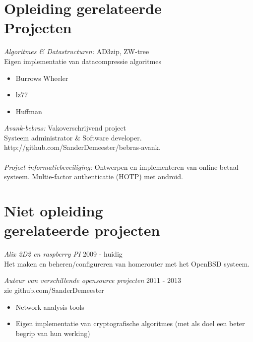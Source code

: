 \documentclass[margin, 10pt]{res} %
\begin{document}
\begin{resume}

\section{Opleiding gerelateerde \\ Projecten} 

{\sl Algoritmes \& Datastructuren:} AD3zip, ZW-tree \\
Eigen implementatie van datacompressie algoritmes
\begin{itemize}
\item Burrows Wheeler
\item lz77
\item Huffman
\end{itemize}
{\sl Avank-bebras:} Vakoverschrijvend project \\
Systeem administrator \& Software developer. \\
http://github.com/SanderDemeester/bebras-avank.
\\ \\
{\sl Project informatiebeveiliging:} Ontwerpen en implementeren van online betaal systeem. Multie-factor authenticatie (HOTP) met android.
 
 
\section{Niet opleiding\\ gerelateerde projecten}

{\sl Alix 2D2 en raspberry PI} \hfill 2009 - huidig  \\
Het maken en beheren/configureren van homerouter met het OpenBSD systeem.

{\sl Auteur van verschillende opensource projecten} \hfill 2011 - 2013  \\
zie github.com/SanderDemeester
\begin{itemize} \itemsep -2pt
\item Network analysis tools
\item Eigen implementatie van cryptografische algoritmes (met als doel een beter begrip van hun werking)
\end{itemize}


\end{resume}
\end{document}
